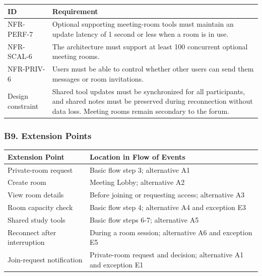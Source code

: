 \documentclass[12pt]{article}
\renewcommand{\baselinestretch}{1.5}
\begin{document}
\begingroup
\small
\renewcommand{\baselinestretch}{1.0}\selectfont
\renewcommand{\arraystretch}{1.15}
\setlength{\tabcolsep}{6pt}
\begin{longtable}{|>{\raggedright\arraybackslash}p{}|>{\raggedright\arraybackslash}p{}|}
\hline
\textbf{ID} & \textbf{Requirement} \\ \hline
\endhead
NFR-PERF-7 & Optional supporting meeting-room tools must maintain an update latency of 1 second or less when a room is in use. \\ \hline
NFR-SCAL-6 & The architecture must support at least 100 concurrent optional meeting rooms. \\ \hline
NFR-PRIV-6 & Users must be able to control whether other users can send them messages or room invitations. \\ \hline
Design constraint & Shared tool updates must be synchronized for all participants, and shared notes must be preserved during reconnection without data loss. Meeting rooms remain secondary to the forum. \\ \hline
\end{longtable}
\endgroup
\par\medskip

\hypertarget{sec:b9-extension-points}{}
\subsubsection*{B9. Extension Points}
\par\medskip

\begingroup
\small
\renewcommand{\baselinestretch}{1.0}\selectfont
\renewcommand{\arraystretch}{1.15}
\setlength{\tabcolsep}{6pt}
\begin{longtable}{|>{\raggedright\arraybackslash}p{}|>{\raggedright\arraybackslash}p{}|}
\hline
\textbf{Extension Point} & \textbf{Location in Flow of Events} \\ \hline
\endhead
Private-room request & Basic flow step 3; alternative A1 \\ \hline
Create room & Meeting Lobby; alternative A2 \\ \hline
View room details & Before joining or requesting access; alternative A3 \\ \hline
Room capacity check & Basic flow step 4; alternative A4 and exception E3 \\ \hline
Shared study tools & Basic flow steps 6-7; alternative A5 \\ \hline
Reconnect after interruption & During a room session; alternative A6 and exception E5 \\ \hline
Join-request notification & Private-room request and decision; alternative A1 and exception E1 \\ \hline
\end{longtable}
\endgroup
\par\medskip
\end{document}
